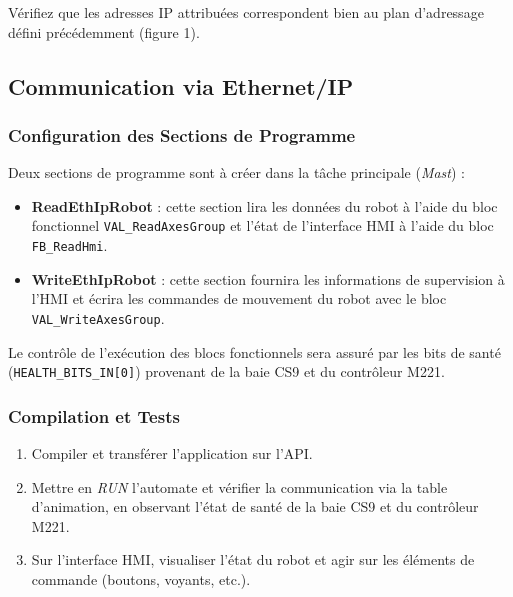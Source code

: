 Vérifiez que les adresses IP attribuées correspondent bien au plan d'adressage défini précédemment (figure 1).

\subsection{Communication via Ethernet/IP}

\subsubsection{Configuration des Sections de Programme}

Deux sections de programme sont à créer dans la tâche principale (\textit{Mast}) :
\begin{itemize}
    \item \textbf{ReadEthIpRobot} : cette section lira les données du robot à l'aide du bloc fonctionnel \texttt{VAL\_ReadAxesGroup} et l'état de l'interface HMI à l'aide du bloc \texttt{FB\_ReadHmi}.
    \item \textbf{WriteEthIpRobot} : cette section fournira les informations de supervision à l'HMI et écrira les commandes de mouvement du robot avec le bloc \texttt{VAL\_WriteAxesGroup}.
\end{itemize}

Le contrôle de l'exécution des blocs fonctionnels sera assuré par les bits de santé (\texttt{HEALTH\_BITS\_IN[0]}) provenant de la baie CS9 et du contrôleur M221.

\subsubsection{Compilation et Tests}

\begin{enumerate}
    \item Compiler et transférer l'application sur l'API.
    \item Mettre en \textit{RUN} l'automate et vérifier la communication via la table d'animation, en observant l'état de santé de la baie CS9 et du contrôleur M221.
    \item Sur l'interface HMI, visualiser l'état du robot et agir sur les éléments de commande (boutons, voyants, etc.).
\end{enumerate}
